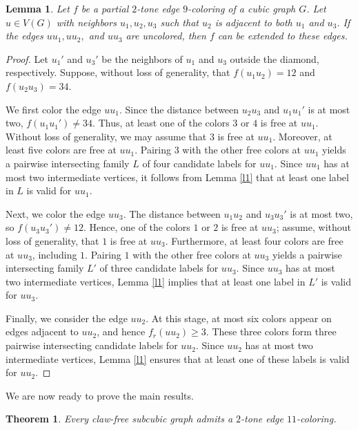 \documentclass[12pt]{article}
\theoremstyle{plain}
\newtheorem{theorem}{Theorem}
\numberwithin{theorem}{section}
\numberwithin{conjecture}{section}
\numberwithin{corollary}{section}
\numberwithin{example}{section}
\newtheorem{lemma}{Lemma}
\numberwithin{lemma}{section}
\numberwithin{proposition}{section}
\numberwithin{problem}{section}
\numberwithin{remark}{section}
\numberwithin{claim}{theorem}
\numberwithin{definition}{section}
\begin{document}
\begin{lemma}\label{l5}
Let $f$ be a partial $2$-tone edge $9$-coloring of a cubic graph $G$. Let $u\in V(G)$ with neighbors $u_1, u_2, u_3$ such that $u_2$ is adjacent to both $u_1$ and $u_3$. If the edges $uu_1, uu_2,$ and $uu_3$ are uncolored, then $f$ can be extended to these edges.
\end{lemma}

\begin{proof}
Let $u_1'$ and $u_3'$ be the neighbors of $u_1$ and $u_3$ outside the diamond, respectively. Suppose, without loss of generality, that $f(u_1u_2)=12$ and $f(u_2u_3)=34$.

\noindent We first color the edge $uu_1$. Since the distance between $u_2u_3$ and $u_1u_1'$ is at most two, $f(u_1u_1')\ne 34$. Thus, at least one of the colors $3$ or $4$ is free at $uu_1$. Without loss of generality, we may assume that $3$ is free at $uu_1$. Moreover, at least five colors are free at $uu_1$. Pairing $3$ with the other free colors at $uu_1$ yields a pairwise intersecting family $L$ of four candidate labels for $uu_1$. Since $uu_1$ has at most two intermediate vertices, it follows from Lemma \ref{l1} that at least one label in $L$ is valid for $uu_1$.

\noindent Next, we color the edge $uu_3$. The distance between $u_1u_2$ and $u_3u_3'$ is at most two, so $f(u_3u_3')\ne 12$. Hence, one of the colors $1$ or $2$ is free at $uu_3$; assume, without loss of generality, that $1$ is free at $uu_3$. Furthermore, at least four colors are free at $uu_3$, including $1$. Pairing $1$ with the other free colors at $uu_3$ yields a pairwise intersecting family $L'$ of three candidate labels for $uu_3$. Since $uu_3$ has at most two intermediate vertices, Lemma \ref{l1} implies that at least one label in $L'$ is valid for $uu_3$.

\noindent Finally, we consider the edge $uu_2$. At this stage, at most six colors appear on edges adjacent to $uu_2$, and hence $f_r(uu_2)\ge 3$. These three colors form three pairwise intersecting candidate labels for $uu_2$. Since $uu_2$ has at most two intermediate vertices, Lemma \ref{l1} ensures that at least one of these labels is valid for $uu_2$.\end{proof}

We are now ready to prove the main results.

\begin{theorem}\label{t5}
Every claw-free subcubic graph admits a $2$-tone edge $11$-coloring.
\end{theorem}
\end{document}
